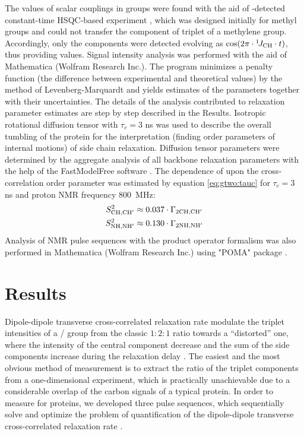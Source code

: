 \documentclass[twocolumn]{svjour3}           %
\begin{document}
The values of \oneJxh{} scalar couplings in \XHtwo{} groups were 
found with the aid of \hlab-detected constant-time {HSQC}-based 
experiment \cite{zhang_probing_2006,lesovoy_nmr_2017}, which was 
designed initially for methyl groups and could not transfer the 
\qinner{} component of \clab{} triplet \TermInner{}
of a methylene group. Accordingly, only the \qouter{} \TermOuter{}
components were detected evolving as 
$\cos(2\pi \cdot {\ensuremath{^1\!J_\text{CH}}} \cdot t)$, thus providing \oneJch{} 
values. Signal intensity analysis was performed with the aid of 
Mathematica (Wolfram Research Inc.). The program minimizes a penalty 
function (the difference between experimental and theoretical values) 
by the method of Levenberg-Marquardt \cite{press_chapter_1992} and 
yields estimates of the parameters together with their uncertainties. 
The details of the analysis contributed to \gtwoXH{} relaxation 
parameter estimates are step by step described in the Results. 
Isotropic rotational diffusion tensor with $\tau_c = 3$ ns was used to 
describe the overall tumbling of the protein for the interpretation 
(finding order parameters of internal motions) of side chain relaxation. 
Diffusion tensor parameters were determined by the aggregate analysis of 
all backbone \nlab{} relaxation parameters with the help of the 
FastModelFree software \cite{cole_fast-modelfree_2003}. The dependence 
of \gtwoCH{} upon the cross-correlation order parameter \StwoCHp{} was estimated 
by equation \eqref{eq:gtwo:tauc} for $\tau_c = 3$ ns and 
proton {NMR} frequency 800~MHz: 
\begin{align}
\label{eq:gapprox2}
     S^2_{\text{CH,CH}'}  & \approx 0.037 \cdot \Gamma_{\text{2CH,CH}'} \\
     S^2_{\text{NH,NH}'}  & \approx 0.130 \cdot \Gamma_{\text{2NH,NH}'}
\end{align}
Analysis of NMR pulse sequences with the product operator formalism was also performed in Mathematica (Wolfram Research Inc.) using "POMA" package \cite{guntert_poma:_1993,guntert_symbolic_2006,benesi_primer_2015}.


\section{Results}
\label{results}
Dipole-dipole transverse cross-correlated relaxation rate \gtwoXH{} mo\-dulate the \nclab{}
triplet intensities of a \CHtwo/\NHtwo{} group from the classic $1:2:1$ 
ratio towards a \enquote{distorted} one, where the intensity of the central 
component decrease and the sum of the side components increase during the 
relaxation delay \cite{yang_probing_2011,zheng_measurement_2004}. The 
easiest and the most obvious method of \gtwo{} measurement is to extract 
the ratio of the triplet components from a one-dimensional \clab{} 
experiment, which is practically unachievable due to a considerable overlap 
of the carbon signals of a typical protein. In order to measure \gtwo{} 
for proteins, we developed three pulse se\-quen\-ces, which sequentially solve 
and optimize the problem of quantification of the dipole-dipole transverse 
cross-cor\-related relaxation rate \gtwo.
\end{document}

